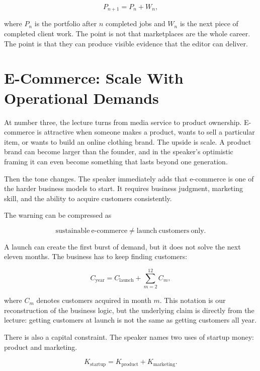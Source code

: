 \begin{equation}
P_{n+1}
=
P_n
+
W_n ,
\end{equation}

where \(P_n\) is the portfolio after \(n\) completed jobs and \(W_n\) is the next piece of completed client work. The point is not that marketplaces are the whole career. The point is that they can produce visible evidence that the editor can deliver.

\section{E-Commerce: Scale With Operational Demands}

At number three, the lecture turns from media service to product ownership. E-commerce is attractive when someone makes a product, wants to sell a particular item, or wants to build an online clothing brand. The upside is scale. A product brand can become larger than the founder, and in the speaker's optimistic framing it can even become something that lasts beyond one generation.

Then the tone changes. The speaker immediately adds that e-commerce is one of the harder business models to start. It requires business judgment, marketing skill, and the ability to acquire customers consistently.

The warning can be compressed as

\begin{equation}
\mathrm{sustainable\ e\mbox{-}commerce}
\neq
\mathrm{launch\ customers\ only}.
\end{equation}

A launch can create the first burst of demand, but it does not solve the next eleven months. The business has to keep finding customers:

\begin{equation}
C_{\mathrm{year}}
=
C_{\mathrm{launch}}
+
\sum_{m=2}^{12} C_m ,
\end{equation}

where \(C_m\) denotes customers acquired in month \(m\). This notation is our reconstruction of the business logic, but the underlying claim is directly from the lecture: getting customers at launch is not the same as getting customers all year.

There is also a capital constraint. The speaker names two uses of startup money: product and marketing.

\begin{equation}
K_{\mathrm{startup}}
=
K_{\mathrm{product}}
+
K_{\mathrm{marketing}}.
\end{equation}

